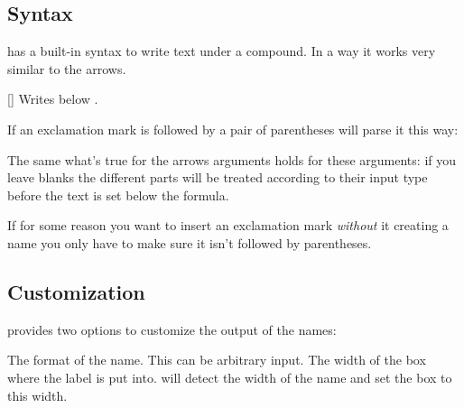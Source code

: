 \documentclass[load-preamble+]{cnltx-doc}
\begin{document}
\subsection{Syntax}
\chemformula{} has a built-in syntax to write text under a compound.  In a way
it works very similar to the arrows.
\begin{commands}
  []
    Writes  below .
\end{commands}
If an exclamation mark is followed by a pair of parentheses \chemformula{} will
parse it this way:
\begin{example}
\end{example}
The same what's true for the arrows arguments holds for these arguments: if
you leave blanks the different parts will be treated according to their input
type before the text is set below the formula.
\begin{example}
   \quad
   \quad
   \quad
   \quad
\end{example}
If for some reason you want to insert an exclamation mark \emph{without} it
creating a name you only have to make sure it isn't followed by parentheses.
\begin{example}
   \par
\end{example}

\subsection{Customization}
\chemformula{} provides two options to customize the output of the names:
\begin{options}
   The format of the name.  This can be arbitrary input.
   The width of the box where the label is put into.   will detect
   the width of the name and set the box to this width.
\end{options}
\begin{example}
   \par
   \par
   \par
\end{example}
\end{document}
